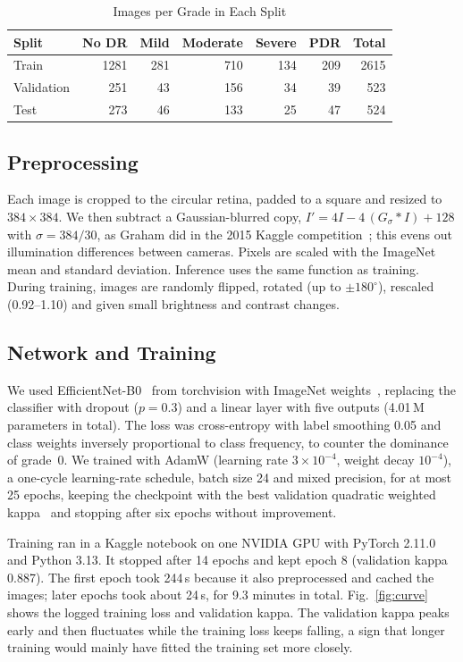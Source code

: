 \documentclass[conference]{IEEEtran}
\begin{document}
\begin{table}[t]
\caption{Images per Grade in Each Split}
\label{tab:data}
\centering\scriptsize
\begin{tabular}{@{}lrrrrrr@{}}
\toprule
Split & No DR & Mild & Moderate & Severe & PDR & Total \\
\midrule
Train & 1281 & 281 & 710 & 134 & 209 & 2615 \\
Validation & 251 & 43 & 156 & 34 & 39 & 523 \\
Test & 273 & 46 & 133 & 25 & 47 & 524 \\
\bottomrule
\end{tabular}
\end{table}

\subsection{Preprocessing}
Each image is cropped to the circular retina, padded to a square and resized to $384\times384$. We then subtract a
Gaussian-blurred copy, $I' = 4I - 4\,(G_\sigma * I) + 128$ with $\sigma = 384/30$, as Graham did in the 2015 Kaggle
competition~\cite{graham2015}; this evens out illumination differences between cameras. Pixels are scaled with the
ImageNet mean and standard deviation. Inference uses the same function as training. During training, images are
randomly flipped, rotated (up to $\pm180^\circ$), rescaled (0.92--1.10) and given small brightness and contrast changes.

\subsection{Network and Training}
We used EfficientNet-B0~\cite{tan2019} from torchvision with ImageNet weights~\cite{deng2009}, replacing the classifier
with dropout ($p=0.3$) and a linear layer with five outputs (4.01\,M parameters in total). The loss was cross-entropy
with label smoothing 0.05 and class weights inversely proportional to class frequency, to counter the dominance of
grade~0. We trained with AdamW (learning rate $3\times10^{-4}$, weight decay $10^{-4}$), a one-cycle learning-rate
schedule, batch size 24 and mixed precision, for at most 25 epochs, keeping the checkpoint with the best validation
quadratic weighted kappa~\cite{cohen1968} and stopping after six epochs without improvement.

Training ran in a Kaggle notebook on one NVIDIA GPU with PyTorch 2.11.0 and Python 3.13. It stopped after 14 epochs
and kept epoch 8 (validation kappa 0.887). The first epoch took 244\,s because it also preprocessed and cached the
images; later epochs took about 24\,s, for 9.3 minutes in total. Fig.~\ref{fig:curve} shows the logged training loss
and validation kappa. The validation kappa peaks early and then fluctuates while the training loss keeps falling, a
sign that longer training would mainly have fitted the training set more closely.
\end{document}
